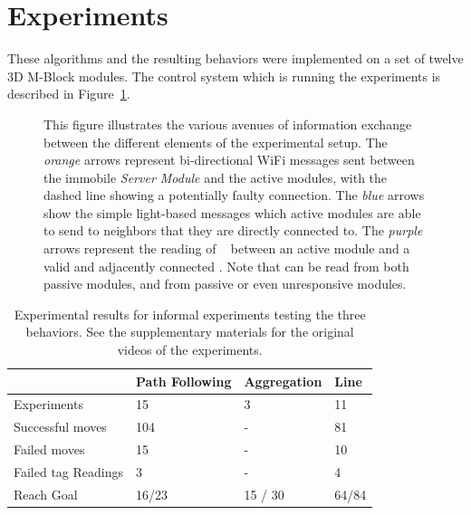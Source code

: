 \section{Experiments}
\label{sec:Experiments}

These algorithms and the resulting behaviors were implemented on a set of twelve 3D M-Block modules. The control system which is running the experiments is described in Figure~\ref{fig:electroncsChart}.

\begin{figure}[ht]

	
	
\caption{This figure illustrates the various avenues of information exchange between the different elements of the experimental setup. The \emph{orange} arrows represent bi-directional WiFi messages sent between the immobile \emph{Server Module} and the active modules, with the dashed line showing a potentially faulty connection. The \emph{blue} arrows show the simple light-based messages which active modules are able to send to neighbors that they are directly connected to. The \emph{purple} arrows represent the reading of \tagNamePlural~ between an active module and a valid and adjacently connected \tagName. Note that \tagNamePlural can be read from both passive modules, and from passive or even unresponsive modules.}
	
	\label{fig:electroncsChart}
\end{figure}

\begin{table}[h]
	\caption{Experimental results for informal experiments testing the three behaviors. See the supplementary materials for the original videos of the experiments.}
	
	\begin{tabular}{ p{2.2cm}  p{1.8cm}  p{1.4cm} p{1.3cm} }
		\hline
								& Path Following& Aggregation 	& Line		\\
		\hline
		Experiments				&  15 			& 3				& 11 		\\
		Successful moves		&  104			& -				& 81			\\
		Failed moves			&  15			& -				& 10			\\
		Failed tag Readings		&  3			& -				& 4			\\
		Reach Goal				&  16/23		& 15 / 30		& 64/84		\\

		
		
		
		
		
		
	\end{tabular}
	
	\label{tab:info}
\end{table}

